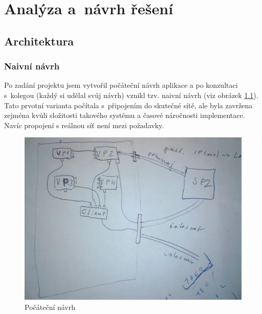 \chapter{Analýza a~návrh řešení}\label{kap:analyza}



\section{Architektura}

\subsection{Naivní návrh}
Po zadání projektu jsem vytvořil počáteční návrh aplikace a po konzultaci s~kolegou (každý si udělal svůj návrh) vznikl tzv. naivní návrh (viz obrázek \ref{fig:navrh}). Tato prvotní varianta počítala s~připojením do skutečné sítě, ale byla zavržena zejména kvůli složitosti takového systému a časové náročnosti implementace. Navíc propojení s reálnou síť není mezi požadavky.

\begin{figure}[h]
\begin{center}
\includegraphics[width=12cm]{figures/navrh}
\caption{Počáteční návrh}
\label{fig:navrh}
\end{center}
\end{figure}

